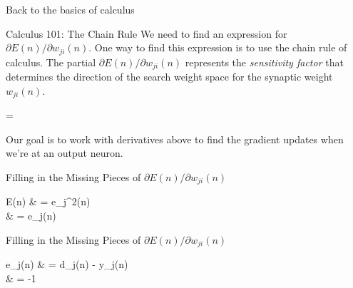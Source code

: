 \documentclass[aspectratio=169,xcolor=dvipsnames,svgnames,x11names,fleqn]{beamer}
\begin{document}
\begin{frame}{Back to the basics of calculus}

\begin{tblock}{Calculus 101: The Chain Rule}
We need to find an expression for ${\partial E(n)}/{\partial w_{ji}(n)}$. One way to find this expression is to use the chain rule of calculus. The partial ${\partial E(n)}/{\partial w_{ji}(n)}$ represents the {\em sensitivity factor} that determines the direction of the search weight space for the synaptic weight $w_{ji}(n)$.  
\begin{multiequation}
 = 
 \cdot 
{} \cdot 
{} \cdot 
{}
\end{multiequation}
\end{tblock}



\end{frame}



\begin{frame}{}

	\begin{tblock}{}
		Our goal is to work with derivatives above to find the gradient updates when we're at an output neuron. 
	\end{tblock}

	
\end{frame}
\begin{frame}{Filling in the Missing Pieces of ${\partial E(n)}/{\partial w_{ji}(n)}$}


	\begin{center}
		\begin{tblock}{}
			\begin{multiequation}
				E(n) & = \sum e_j^2(n)\\
				 & = e_j(n)
			\end{multiequation}
			\end{tblock}
	\end{center}

\end{frame}

%

\begin{frame}{Filling in the Missing Pieces of ${\partial E(n)}/{\partial w_{ji}(n)}$}


	\begin{center}
		\begin{tblock}{}
			\begin{multiequation}
				e_j(n) & = d_j(n) - y_j(n)\\
				\frac{\partial e_j(n)}{\partial y_j(n)} & = -1
			\end{multiequation}
		\end{tblock}
	\end{center}

\end{frame}
%
\end{document}
